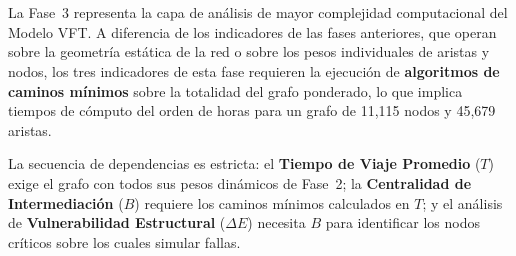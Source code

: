 \section{}
\label{sec:resultados-fase3}


La Fase~3 representa la capa de análisis de mayor complejidad computacional del
Modelo VFT. A diferencia de los indicadores de las fases anteriores, que operan
sobre la geometría estática de la red o sobre los pesos individuales de aristas
y nodos, los tres indicadores de esta fase requieren la ejecución de
\textbf{algoritmos de caminos mínimos} sobre la totalidad del grafo ponderado,
lo que implica tiempos de cómputo del orden de horas para un grafo de 11{,}115
nodos y 45{,}679 aristas.

La secuencia de dependencias es estricta: el \textbf{Tiempo de Viaje Promedio}
($T$) exige el grafo con todos sus pesos dinámicos de Fase~2; la
\textbf{Centralidad de Intermediación} ($B$) requiere los caminos mínimos
calculados en $T$; y el análisis de \textbf{Vulnerabilidad Estructural} ($
\Delta E$) necesita $B$ para identificar los nodos críticos sobre los cuales
simular fallas.

\subsection{}
\label{subsec:tiempo-viaje-promedio}


